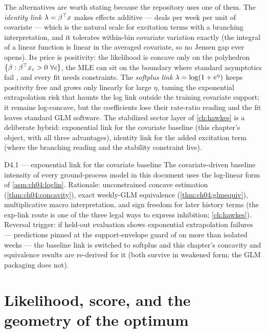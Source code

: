 The alternatives are worth stating because the repository uses one of them.
The \emph{identity link} $\lambda = \beta^{\top}x$ makes effects additive ---
deals per week per unit of covariate --- which is the natural scale for
excitation terms with a branching interpretation, and it tolerates
within-bin covariate variation exactly (the integral of a linear function
is linear in the averaged covariate, so no Jensen gap ever opens). Its
price is positivity: the likelihood is concave only on the polyhedron
$\{\beta : \beta^{\top}x_c > 0\ \forall c\}$, the MLE can sit on the
boundary where standard asymptotics fail \citep{selfliang1987}, and every
fit needs constraints. The \emph{softplus link} $\lambda = \log(1 +
e^{\eta})$ keeps positivity free and grows only linearly for large $\eta$,
taming the exponential extrapolation risk that haunts the log link outside
the training covariate support; it remains log-concave, but the
coefficients lose their rate-ratio reading and the fit leaves standard GLM
software. The stabilized sector layer of \cref{ch:hawkes} is a deliberate
hybrid: exponential link for the covariate baseline (this chapter's
object, with all three advantages), identity link for the added excitation
term (where the branching reading and the stability constraint live).

\begin{decision}{D4.1 --- exponential link for the covariate baseline}
The covariate-driven baseline intensity of every ground-process model in
this document uses the log-linear form of \cref{asm:ch04:loglin}.
Rationale: unconstrained concave estimation (\cref{thm:ch04:concavity}),
exact weekly-GLM equivalence (\cref{thm:ch04:glmequiv}), multiplicative
macro interpretation, and sign freedom for later history terms (the
exp-link route is one of the three legal ways to express inhibition;
\cref{ch:hawkes}). Reversal trigger: if held-out evaluation shows
exponential extrapolation failures --- predictions pinned at the
support-envelope guard of  on more than
isolated weeks --- the baseline link is switched to softplus and this
chapter's concavity and equivalence results are re-derived for it (both
survive in weakened form; the GLM packaging does not).
\end{decision}

\section{Likelihood, score, and the geometry of the optimum}\label{ch04:sec:likelihood}

